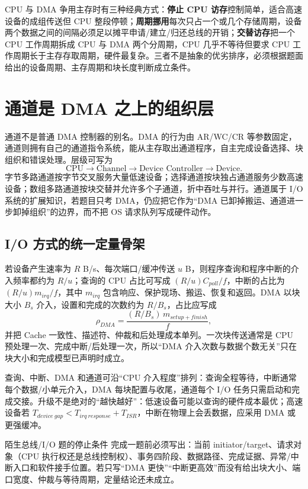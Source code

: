 \documentclass[UTF8,fontset=fandol,11pt,a4paper]{ctexart}
\newcommand{\kw}[1]{\textbf{\color{deep}#1}}
\begin{document}
CPU 与 DMA 争用主存时有三种经典方式：\kw{停止 CPU 访存}控制简单，适合高速设备的成组传送但 CPU 整段停顿；\kw{周期挪用}每次只占一个或几个存储周期，设备两个数据之间的间隔必须足以摊平申请/建立/归还总线的开销；\kw{交替访存}把一个 CPU 工作周期拆成 CPU 与 DMA 两个分周期，CPU 几乎不等待但要求 CPU 工作周期长于主存存取周期，硬件最复杂。三者不是抽象的优劣排序，必须根据题面给出的设备周期、主存周期和块长度判断成立条件。

\section{通道是 DMA 之上的组织层}
通道不是普通 DMA 控制器的别名。DMA 的行为由 AR/WC/CR 等参数固定，通道则拥有自己的通道指令系统，能从主存取出通道程序，自主完成设备选择、块组织和错误处理。层级可写为
\[
\text{CPU}\to\text{Channel}\to\text{Device Controller}\to\text{Device}.
\]
字节多路通道按字节交叉服务大量低速设备；选择通道按块独占通道服务少数高速设备；数组多路通道按块交替并允许多个子通道，折中吞吐与并行。通道属于 I/O 系统的扩展知识，若题目只考 DMA，仍应把它作为“DMA 已卸掉搬运、通道进一步卸掉组织”的边界，而不把 OS 请求队列写成硬件动作。

\subsection{I/O 方式的统一定量骨架}
若设备产生速率为 $R$ B/s、每次端口/缓冲传送 $u$ B，则程序查询和程序中断的介入频率都约为 $R/u$；查询的 CPU 占比可写成 $(R/u)C_{poll}/f$，中断的占比为 $(R/u)m_{irq}/f$，其中 $m_{irq}$ 包含响应、保护现场、搬运、恢复和返回。DMA 以块大小 $B_s$ 介入，设置和完成的次数约为 $R/B_s$，占比应写成
\[
\rho_{DMA}=\frac{(R/B_s)\,m_{setup+finish}}{f},
\]
并把 Cache 一致性、描述符、仲裁和后处理成本单列。一次块传送通常是 CPU 预处理一次、完成中断/后处理一次，所以“DMA 介入次数与数据个数无关”只在块大小和完成模型已声明时成立。

查询、中断、DMA 和通道可沿“CPU 介入程度”排列：查询全程等待，中断通常每个数据/小单元介入，DMA 每块配置与收尾，通道每个 I/O 任务只需启动和完成交接。升级不是绝对的“越快越好”：低速设备可能以查询的硬件成本最优；高速设备若 $T_{device\ gap}<T_{irq\ response}+T_{ISR}$，中断在物理上会丢数据，应采用 DMA 或更强缓冲。

\begin{methodbox}{陌生总线/I/O 题的停止条件}
完成一题前必须写出：当前 initiator/target、请求对象（CPU 执行权还是总线控制权）、事务四阶段、数据路径、完成证据、异常/中断入口和软件接手位置。若只写“DMA 更快”“中断更高效”而没有给出块大小、端口宽度、仲裁与等待周期，定量结论还未成立。
\end{methodbox}
\end{document}
